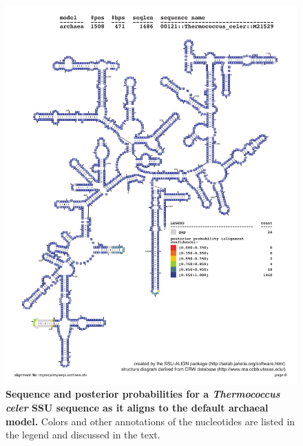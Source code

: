 \begin{figure}
  \begin{center}
\includegraphics[width=5.7in]{Figures/myseqs-archaea-indi-2}
  \end{center}
\caption{\textbf{Sequence and posterior probabilities for a
    \emph{Thermococcus celer} SSU sequence as it aligns to the default
    archaeal model.} Colors and other annotations of the nucleotides
  are listed in the legend and discussed in the text.}
\label{fig:myseqs-archaea-indi-2}
\end{figure}
